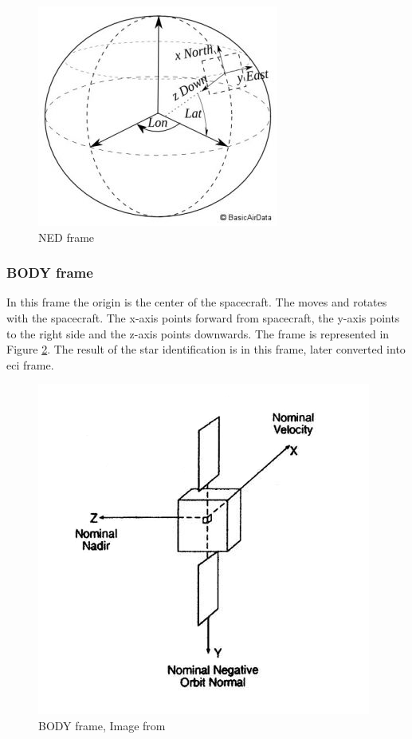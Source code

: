 \documentclass[12pt,a4paper,twoside]{article}
\begin{document}
\begin{figure}[!htb]
\includegraphics[scale=0.6]{ned_frame.jpg}
\centering
\caption[NED frame]{NED frame\cite{ned-frame-image}}
\label{fig:ned_frame}
\end{figure}

\subsubsection{BODY frame}
In this frame the origin is the center of the spacecraft. The moves and rotates with the spacecraft. The x-axis points forward from spacecraft, the y-axis points to the right side and the z-axis points downwards. The frame is represented in Figure \ref{fig:body_frame}. The result of the star identification is in this frame, later converted into \gls{eci} frame.

\begin{figure}[!htb]
\includegraphics[scale=0.5]{body_frame.jpg}
\centering
\caption[BODY frame]{BODY frame, Image from \citet{larson1992space}}
\label{fig:body_frame}
\end{figure}
\end{document}
